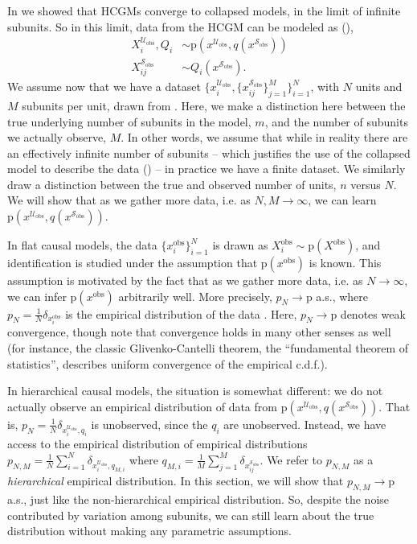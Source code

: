 \documentclass[12pt]{article}
\newcommand{\Sc}{\mathcal{S}}
\newcommand{\Uc}{\mathcal{U}}
\newcommand{\pr}{\mathrm{p}}
\newcommand{\obs}{\mathrm{obs}}
\begin{document}
In  we showed that HCGMs converge to collapsed models, in the limit of infinite subunits. So in this limit, data from the HCGM can be modeled as (),
\begin{equation} \label{eqn:hcm_observed_generation}
\begin{split}
	X^{\Uc_\obs}_i, Q_i &\sim \pr(x^{\Uc_\obs}, q(x^{\Sc_\obs}))\\
	X^{\Sc_\obs}_{ij} &\sim Q_i(x^{\Sc_\obs}).
\end{split}
\end{equation}
We assume now that we have a dataset $\{x^{\Uc_\obs}_i, \{x^{\Sc_\obs}_{ij}\}_{j=1}^M\}_{i=1}^N $, with $N$ units and $M$ subunits per unit, drawn from . 
Here, we make a distinction here between the true underlying number of subunits in the model, $m$, and the number of subunits we actually observe, $M$.
In other words, we assume that while in reality there are an effectively infinite number of subunits -- which justifies the use of the collapsed model to describe the data () -- in practice we have a finite dataset.
We similarly draw a distinction between the true and observed number of units, $n$ versus $N$.
We will show that as we gather more data, i.e. as $N,M\to\infty$, we can learn $\pr(x^{\Uc_\obs}, q(x^{\Sc_\obs}))$.

In flat causal models, the data $\{x_{i}^\obs\}_{i=1}^N$ is drawn as $X_i^\obs \sim \pr(X^{\obs})$, and identification is studied under the assumption that $\pr(x^{\obs})$ is known.
This assumption is motivated by the fact that as we gather more data, i.e. as $N \to \infty$, we can infer $\pr(x^{\obs})$ arbitrarily well.
More precisely, $p_N \to \pr$ a.s., where $p_N = \frac{1}{N} \delta_{x_i^\obs}$ is the empirical distribution of the data \citep[e.g.][Theorem 11.4.1]{Dudley2002-pd}.
Here, $p_N \to \pr$ denotes weak convergence, though note that convergence holds in many other senses as well (for instance, the classic Glivenko-Cantelli theorem, the ``fundamental theorem of statistics'', describes uniform convergence of the empirical c.d.f.).

In hierarchical causal models, the situation is somewhat different: we do not actually observe an empirical distribution of data from $\pr(x^{\Uc_\obs}, q(x^{\Sc_\obs}))$.
That is, $p_N = \frac{1}{N} \delta_{x^{\Uc_\obs}_i, q_i}$ is unobserved, since the $q_i$ are unobserved.
Instead, we have access to the empirical distribution of empirical distributions $p_{N,M} = \frac{1}{N} \sum_{i=1}^N \delta_{x^{\Uc_\obs}_i,q_{M,i}}$ where $q_{M,i} = \frac{1}{M}\sum_{j=1}^M \delta_{x^{\Sc_\obs}_{ij}}$.
We refer to $p_{N,M}$ as a \textit{hierarchical} empirical distribution.
In this section, we will show that $p_{N,M} \to \pr$ a.s., just like the non-hierarchical empirical distribution. So, despite the noise contributed by variation among subunits, we can still learn about the true distribution without making any parametric assumptions. 
\end{document}
